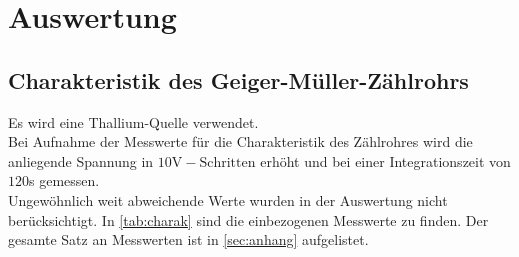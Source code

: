 \section{Auswertung}
\label{sec:Auswertung}
\subsection{Charakteristik des Geiger-Müller-Zählrohrs}

Es wird eine Thallium-Quelle verwendet. \\
Bei Aufnahme der Messwerte für die Charakteristik des Zählrohres wird 
die anliegende Spannung in $10\mathrm{V-Schritten}$ erhöht und bei einer Integrationszeit
von $120$s gemessen.\\
Ungewöhnlich weit abweichende Werte wurden in der Auswertung nicht berücksichtigt. In \autoref{tab:charak} 
sind die einbezogenen Messwerte zu finden. Der gesamte Satz an Messwerten ist in 
\autoref{sec:anhang} aufgelistet.\\

